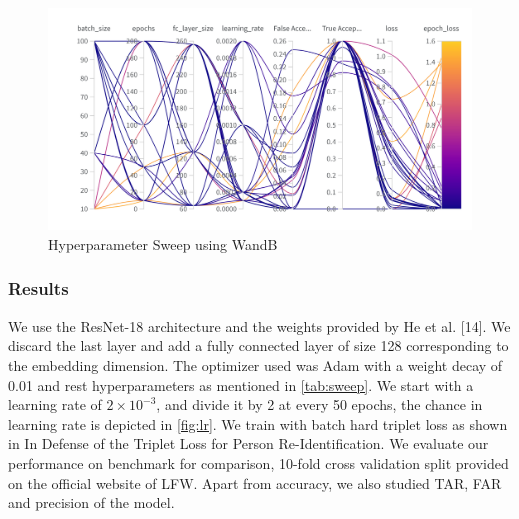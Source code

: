 \documentclass[
12pt,
tightenlines,
aps,
prb,
twocolumn,
superscriptaddress,
longbibliography,
floatfix
]{revtex4-2}
\newcounter{para}
\begin{document}
\begin{figure}[t]
    \includegraphics[clip=true,width=2\columnwidth]{face_unlock sweep.png}
    \caption{Hyperparameter Sweep using WandB} 
     \label{fig:sweep}
\end{figure}

\subsubsection{Results}
We use the ResNet-18 architecture and the weights provided by He et al. [14]. We discard the last layer and add a fully connected layer of size 128 corresponding to the embedding dimension. The optimizer used was Adam with a weight decay of 0.01 and rest hyperparameters as mentioned in \ref{tab:sweep}. We start with a learning
rate of $2\times10^{-3}$, and divide it by 2 at every 50 epochs, the chance in learning rate is depicted in \ref{fig:lr}. We train with batch hard triplet loss as shown in In Defense of the Triplet Loss for Person Re-Identification. We evaluate our performance on benchmark for comparison, 10-fold cross validation split provided on the official website of LFW. Apart from accuracy, we also studied TAR, FAR and precision of the model. 
\end{document}
